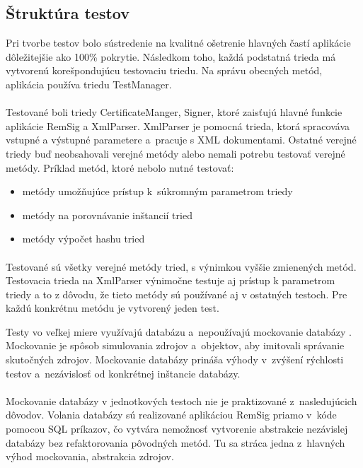 \documentclass[
  printed, %
  table,   %
oneside,
  nolof,     %
  nolot,     %
]{fithesis3}
\begin{document}
\subsection{Štruktúra testov}
Pri tvorbe testov bolo sústredenie na kvalitné ošetrenie hlavných častí aplikácie dôležitejšie ako 100\% pokrytie. Následkom toho, každá podstatná trieda má vytvorenú korešpondujúcu testovaciu triedu. Na správu obecných metód, aplikácia používa triedu TestManager. \paragraph{}
Testované boli triedy CertificateManger, Signer, ktoré zaisťujú hlavné funkcie aplikácie RemSig a XmlParser. XmlParser je pomocná trieda, ktorá spracováva vstupné a výstupné parametere a~pracuje s XML dokumentami.
Ostatné verejné triedy buď neobsahovali verejné metódy alebo nemali potrebu testovať verejné metódy. Príklad metód, ktoré nebolo nutné testovať: 
\begin{itemize}	
	\item metódy umožňujúce prístup k~súkromným parametrom triedy
	\item metódy na porovnávanie inštancií tried
	\item metódy výpočet hashu tried
\end{itemize}

 \paragraph{}
Testované sú všetky verejné metódy tried, s výnimkou vyššie zmienených metód. Testovacia trieda na XmlParser výnimočne testuje aj prístup k parametrom triedy a to z dôvodu, že tieto metódy sú používané aj v ostatných testoch. Pre každú konkrétnu metódu je vytvorený jeden test. 

Testy vo veľkej miere využívajú databázu a~nepoužívajú mockovanie databázy \cite{mocking}. Mockovanie je spôsob simulovania zdrojov a~objektov, aby imitovali správanie skutočných zdrojov. Mockovanie databázy prináša výhody v~zvýšení rýchlosti testov a~nezávislosť od konkrétnej inštancie databázy. \paragraph{}

Mockovanie databázy v jednotkových testoch nie je praktizované z~nasledujúcich dôvodov. Volania databázy sú realizované aplikáciou RemSig priamo v~kóde pomocou SQL príkazov, čo vytvára nemožnosť vytvorenie abstrakcie nezávislej databázy bez refaktorovania pôvodných metód. Tu sa stráca jedna z~hlavných výhod mockovania, abstrakcia zdrojov.
\end{document}
